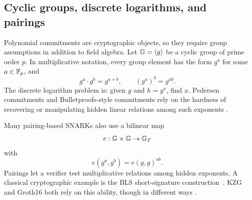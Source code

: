 \subsection{Cyclic groups, discrete logarithms, and pairings}

Polynomial commitments are cryptographic objects, so they require group assumptions in addition to field algebra. Let $\mathbb{G}=\langle g\rangle$ be a cyclic group of prime order $p$. In multiplicative notation, every group element has the form $g^a$ for some $a\in\mathbb{F}_p$, and
\[
    g^a\cdot g^b = g^{a+b},
    \qquad
    (g^a)^b=g^{ab}.
\]
The discrete logarithm problem is: given $g$ and $h=g^x$, find $x$. Pedersen commitments and Bulletproofs-style commitments rely on the hardness of recovering or manipulating hidden linear relations among such exponents \cite{Pedersen1991,Bulletproofs2018}.

Many pairing-based SNARKs also use a bilinear map
\[
    e:\mathbb{G}\times\mathbb{G}\to\mathbb{G}_T
\]
with
\[
    e(g^a,g^b)=e(g,g)^{ab}.
\]
Pairings let a verifier test multiplicative relations among hidden exponents. A classical cryptographic example is the BLS short-signature construction~\cite{BonehLynnShacham2001}. KZG and Groth16 both rely on this ability, though in different ways \cite{KateZaveruchaGoldberg2010,Groth2016}.

